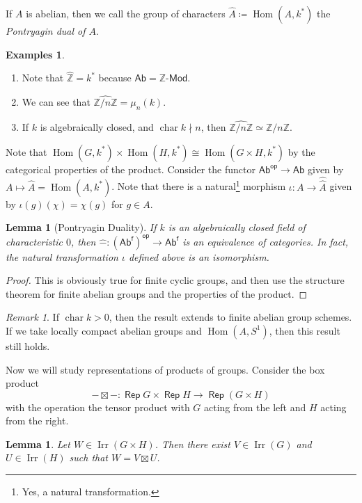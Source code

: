 \documentclass[leqno, openany]{memoir}
\newtheorem{lem}[thm]{Lemma}
\theoremstyle{definition}
\newtheorem{exms}[thm]{Examples}
\theoremstyle{remark}
\newtheorem{rmk}[thm]{Remark}
\theoremstyle{plain}
\theoremstyle{definition}
\theoremstyle{remark}
\newcommand{\Z}{\mathbb{Z}}
\newcommand{\wh}[1]{\widehat{#1}}
\DeclareMathOperator{\Irr}{\mathrm{Irr}}
\DeclareMathOperator{\Rep}{\mathsf{Rep}}
\DeclareMathOperator{\Hom}{Hom}
\DeclareMathOperator{\Char}{char}
\begin{document}
If $A$ is abelian, then we call the group of characters $\wh{A} \coloneqq \Hom(A, k^*)$ the \textit{Pontryagin dual of $A$}.

\begin{exms}
    \hfill
    \begin{enumerate}
        \item Note that $\wh{\Z} = k^*$ because $\mathsf{Ab} = \Z\text{-}\mathsf{Mod}$.
        \item We can see that $\wh{\Z/n\Z} = \mu_n(k)$.
        \item If $k$ is algebraically closed, and $\Char k \nmid n$, then $\wh{\Z/n\Z} \simeq \Z/n\Z$.
    \end{enumerate}
\end{exms}

Note that $\Hom(G, k^*) \times \Hom(H, k^*) \cong \Hom(G \times H, k^*)$ by the categorical properties of the product. Consider the functor $\mathsf{Ab^{op}} \to \mathsf{Ab}$ given by $A \mapsto \wh{A} = \Hom(A, k^*)$. Note that there is a natural\footnote{Yes, a natural transformation.} morphism $\iota: A \to \wh{\wh{A}}$ given by $\iota(g)(\chi) = \chi(g)$ for $g \in A$.

\begin{lem}[Pontryagin Duality]
    If $k$ is an algebraically closed field of characteristic $0$, then $\wh{-}: \mathsf{(Ab^f)^{op}} \to \mathsf{Ab^f}$ is an equivalence of categories. In fact, the natural transformation $\iota$ defined above is an isomorphism.
\end{lem}

\begin{proof}
    This is obviously true for finite cyclic groups, and then use the structure theorem for finite abelian groups and the properties of the product.
\end{proof}

\begin{rmk}
    If $\Char k > 0$, then the result extends to finite abelian group schemes. If we take locally compact abelian groups and $\Hom(A, S^1)$, then this result still holds.
\end{rmk}

Now we will study representations of products of groups. Consider the box product
\[ -\boxtimes-: \Rep G \times \Rep H \to \Rep(G \times H) \]
with the operation the tensor product with $G$ acting from the left and $H$ acting from the right.

\begin{lem}
    Let $W \in \Irr(G \times H)$. Then there exist $V \in \Irr(G)$ and $U \in \Irr(H)$ such that $W = V \boxtimes U$.
\end{lem}
\end{document}
